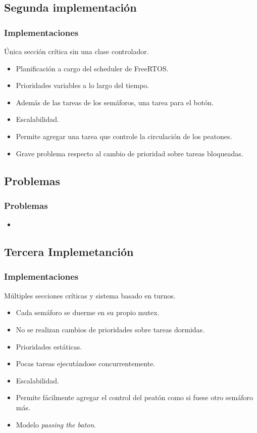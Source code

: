 \subsection{Segunda implementación}
\begin{frame}
\frametitle{Implementaciones}
\begin{block}{Única sección crítica sin una clase controlador.}
	\begin{itemize}
		\item Planificación a cargo del scheduler de FreeRTOS.
		\item Prioridades variables a lo largo del tiempo.
		\item Además de las tareas de los semáforos, una tarea para el botón.
		\item Escalabilidad.
		\item Permite agregar una tarea que controle la circulación de los peatones.
		\item Grave problema respecto al cambio de prioridad sobre tareas bloqueadas.
	\end{itemize}
\end{block}
\end{frame}

\subsection{Problemas}
\begin{frame}
\frametitle{Problemas}
\begin{block}{}
	\begin{itemize}
		\item
	\end{itemize}
\end{block}
\end{frame}

\subsection{Tercera Implemetanción}
\begin{frame}
\frametitle{Implementaciones}
\begin{block}{Múltiples secciones críticas y sistema basado en turnos.}
	\begin{itemize}
		\item Cada semáforo se duerme en su propio mutex.
		\item No se realizan cambios de prioridades sobre tareas dormidas.
		\item Prioridades estáticas.
		\item Pocas tareas ejecutándose concurrentemente.
		\item Escalabilidad.
		\item Permite fácilmente agregar el control del peatón como si fuese otro semáforo más.
		\item Modelo \emph{passing the baton}.
	\end{itemize}
\end{block}
\end{frame}

